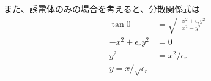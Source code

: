 \documentclass[a4paper,10pt]{bxjsarticle}
\begin{document}
また、誘電体のみの場合を考えると、分散関係式は
\begin{align*}
    \tan 0 &= \sqrt{\frac{-x^2 + \epsilon_r y^2}{ x^2 - y^2}} \\
    -x^2 + \epsilon_r y^2 &= 0 \\
    y^2 &= x^2 / \epsilon_r \\ 
    y = x / \sqrt{\epsilon_r}
\end{align*}





  
\end{document}

